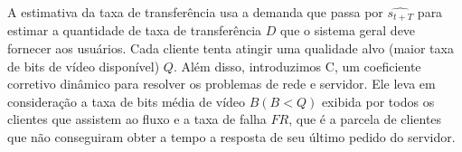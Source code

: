 

A estimativa da taxa de transferência usa a demanda que passa por $\widehat{s_{t+T}}$ para estimar a quantidade de taxa de transferência $D$ que o sistema geral deve fornecer aos usuários. Cada cliente tenta atingir uma qualidade alvo (maior taxa de bits de vídeo disponível) $Q$.
Além disso, introduzimos C, um coeficiente corretivo dinâmico para resolver os problemas de rede e servidor. Ele leva em consideração a taxa de bits média de vídeo $B (B < Q)$ exibida por todos os clientes que assistem ao fluxo e a taxa de falha $FR$, que é a parcela de clientes que não conseguiram obter a tempo a resposta de seu último pedido do servidor.



